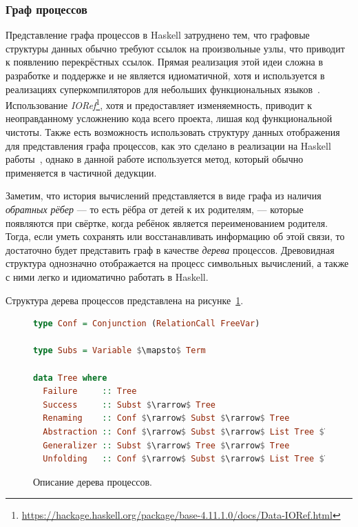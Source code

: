 \subsubsection{Граф процессов}

Представление графа процессов в Haskell затруднено тем, что графовые
структуры данных обычно требуют ссылок на произвольные узлы,
что приводит к появлению перекрёстных ссылок. Прямая реализация этой
идеи сложна в разработке и поддержке и не является идиоматичной, хотя и используется
в реализациях суперкомпиляторов для небольших функциональных языков~\cite{scmini}.
Использование \emph{IORef}\footnote{\url{https://hackage.haskell.org/package/base-4.11.1.0/docs/Data-IORef.html}},
хотя и предоставляет изменяемность, приводит к неоправданному усложнению кода всего
проекта, лишая код функциональной чистоты. Также есть возможность использовать
структуру данных отображения для представления графа процессов, как это сделано
в реализации на Haskell работы~\cite{simplesc}, однако в данной работе используется
метод, который обычно применяется в частичной дедукции.

Заметим, что история вычислений представляется в виде графа из наличия
\emph{обратных рёбер}
--- то есть рёбра от детей к их родителям, --- которые появляются при свёртке,
когда ребёнок является переименованием родителя.
Тогда, если уметь сохранять или восстанавливать информацию об этой связи, то
достаточно будет представить граф в качестве \emph{дерева} процессов.
Древовидная структура однозначно отображается на процесс символьных вычислений,
а также с ними легко и идиоматично работать в Haskell.

Структура дерева процессов представлена на рисунке~\ref{fig:ptree}.

\begin{figure}[h!]
\begin{lstlisting}[mathescape,language=Haskell,extendedchars=\true,frame=single,basicstyle=\ttfamily]
type Conf = Conjunction (RelationCall FreeVar)

type Subs = Variable $\mapsto$ Term

data Tree where
  Failure     :: Tree
  Success     :: Subst $\rarrow$ Tree
  Renaming    :: Conf $\rarrow$ Subst $\rarrow$ Tree
  Abstraction :: Conf $\rarrow$ Subst $\rarrow$ List Tree $\rarrow$ Tree
  Generalizer :: Subst $\rarrow$ Tree $\rarrow$ Tree
  Unfolding   :: Conf $\rarrow$ Subst $\rarrow$ List Tree $\rarrow$ Tree
\end{lstlisting}
\caption{Описание дерева процессов.}
\label{fig:ptree}
\end{figure}

